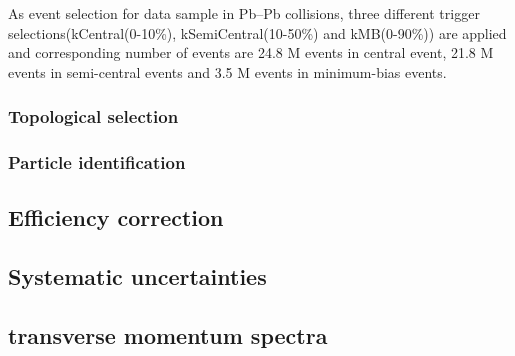 As event selection for data sample in Pb--Pb collisions, three different trigger selections(kCentral(0-10\%), kSemiCentral(10-50\%) and kMB(0-90\%)) are applied and corresponding number of events are 24.8 M events in central event, 21.8 M events in semi-central events and 3.5 M events in minimum-bias events.

\subsubsection{Topological selection}
\subsubsection{Particle identification}


\subsection{Efficiency correction}
\subsection{Systematic uncertainties}
\subsection{\xis transverse momentum spectra}

